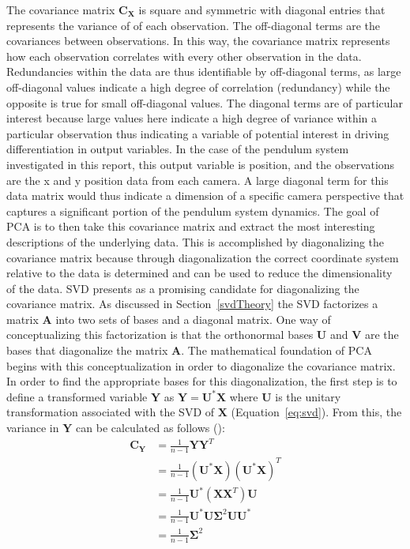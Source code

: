 \documentclass{article}
\begin{document}
The covariance matrix $\mathbf{C}_{\mathbf{X}}$ is square and symmetric with diagonal entries that represents the variance of of each observation. The off-diagonal terms are the covariances between observations. In this way, the covariance matrix represents how each observation correlates with every other observation in the data. Redundancies within the data are thus identifiable by off-diagonal terms, as large off-diagonal values indicate a high degree of correlation (redundancy) while the opposite is true for small off-diagonal values. The diagonal terms are of particular interest because large values here indicate a high degree of variance within a particular observation thus indicating a variable of potential interest in driving differentiation in output variables. In the case of the pendulum system investigated in this report, this output variable is position, and the observations are the x and y position data from each camera. A large diagonal term for this data matrix would thus indicate a dimension of a specific camera perspective that captures a significant portion of the pendulum system dynamics. The goal of PCA is to then take this covariance matrix and extract the most interesting descriptions of the underlying data. This is accomplished by diagonalizing the covariance matrix because through diagonalization the correct coordinate system relative to the data is determined and can be used to reduce the dimensionality of the data. SVD presents as a promising candidate for diagonalizing the covariance matrix. As discussed in Section~\ref{svdTheory} the SVD factorizes a matrix $\mathbf{A}$ into two sets of bases and a diagonal matrix. One way of conceptualizing this factorization is that the orthonormal bases $\mathbf{U}$ and $\mathbf{V}$ are the bases that diagonalize the matrix $\mathbf{A}$. The mathematical foundation of PCA begins with this conceptualization in order to diagonalize the covariance matrix. In order to find the appropriate bases for this diagonalization, the first step is to define a transformed variable $\mathbf{Y}$ as $\mathbf{Y} = \mathbf{U}^*\mathbf{X}$ where $\mathbf{U}$ is the unitary transformation associated with the SVD of $\mathbf{X}$ (Equation~\ref{eq:svd}). From this, the variance in $\mathbf{Y}$ can be calculated as follows (\cite{kutz_2013}):
\begin{equation}\label{eq:covy}
\begin{aligned}
\mathbf{C}_{\mathbf{Y}} &= \frac{1}{n-1}\mathbf{Y}\mathbf{Y^{\mathit{T}}} \\
& = \frac{1}{n-1}(\mathbf{U^{*}X})(\mathbf{U^{*}X})^{\mathit{T}} \\
& = \frac{1}{n-1}\mathbf{U^{*}}(\mathbf{XX}^{\mathit{T}})\mathbf{U} \\
& = \frac{1}{n-1}\mathbf{U^{*}}\mathbf{U}\boldsymbol{\Sigma}^{2}\mathbf{UU^{*}} \\
& = \frac{1}{n-1}\boldsymbol{\Sigma}^{2}
\end{aligned}
\end{equation}
\end{document}
